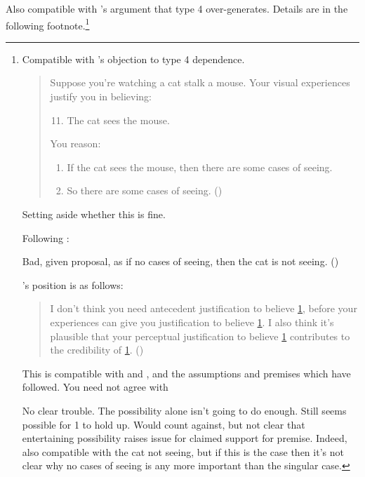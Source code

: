 \begin{note}
  Also compatible with \citeauthor{Pryor:2004ws}'s argument that type 4 over-generates.
  Details are in the following footnote.\footnote{
  Compatible with \citeauthor{Pryor:2004ws}'s objection to type 4 dependence.

    \begin{quote}
      Suppose you're watching a cat stalk a mouse. Your visual experiences justify you in believing:

      \begin{enumerate}[label=(\arabic*), ref=(\arabic*)]
        \setcounter{enumi}{10}
      \item\label{illu:Pryor:cat:1} The cat sees the mouse.
      \end{enumerate}

      You reason:

      \begin{enumerate}[label=(\arabic*), ref=(\arabic*), resume]
      \item\label{illu:Pryor:cat:2} If the cat sees the mouse, then there are some cases of seeing.
      \item\label{illu:Pryor:cat:3} So there are some cases of seeing.\nolinebreak
        \mbox{}\hfill\mbox{(\citeyear[361]{Pryor:2004ws})}
      \end{enumerate}
    \end{quote}

  Setting aside whether this is fine.

  Following \citeauthor{Pryor:2004ws}:

  Bad, given proposal, as if no cases of seeing, then the cat is not seeing. (\citeyear[361]{Pryor:2004ws})

  \citeauthor{Pryor:2004ws}'s position is as follows:

  \begin{quote}
    I don't think you need antecedent justification to believe \ref{illu:Pryor:cat:3}, before your experiences can give you justification to believe \ref{illu:Pryor:cat:1}.
    I also think it's plausible that your perceptual justification to believe \ref{illu:Pryor:cat:1} contributes to the credibility of \ref{illu:Pryor:cat:3}.\nolinebreak
    \mbox{}\hfill\mbox{(\citeyear[361]{Pryor:2004ws})}
  \end{quote}

  This is compatible with \ideaS{} and \ideaCS{}, and the assumptions and premises which have followed.
  You need not agree with \citeauthor{Pryor:2004ws}

  No clear trouble.
  The possibility alone isn't going to do enough.
  Still seems possible for 1 to hold up.
  Would count against, but not clear that entertaining possibility raises issue for claimed support for premise.
  Indeed, also compatible with the cat not seeing, but if this is the case then it's not clear why no cases of seeing is any more important than the singular case.
  }
\end{note}


